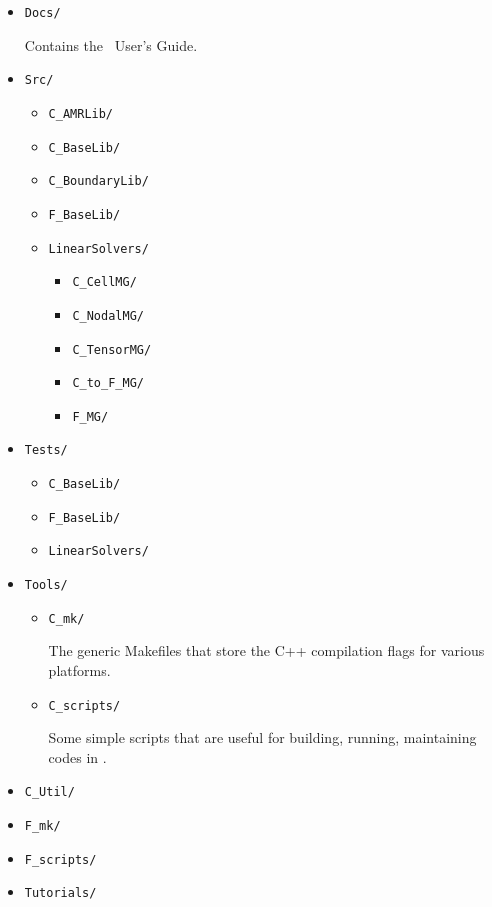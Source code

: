 \begin{itemize}

\item {\tt Docs/}

Contains the \BoxLib\ User's Guide.

\item {\tt Src/}

  \begin{itemize}

    \item {\tt C\_AMRLib/}
    \item {\tt C\_BaseLib/}
    \item {\tt C\_BoundaryLib/}
    \item {\tt F\_BaseLib/}
    \item {\tt LinearSolvers/}

    \begin{itemize}

      \item {\tt C\_CellMG/}
      \item {\tt C\_NodalMG/}
      \item {\tt C\_TensorMG/}
      \item {\tt C\_to\_F\_MG/}
      \item {\tt F\_MG/}

    \end{itemize}

  \end{itemize}

\item {\tt Tests/}

  \begin{itemize}

  \item {\tt C\_BaseLib/}
  \item {\tt F\_BaseLib/}
  \item {\tt LinearSolvers/}

  \end{itemize}

\item {\tt Tools/}

  \begin{itemize}

  \item {\tt C\_mk/}

  The generic Makefiles that store the C++ compilation flags for
  various platforms.

  \item {\tt C\_scripts/}

  Some simple scripts that are useful for building, running,
  maintaining codes in \BoxLib.

  \end{itemize}

  \item {\tt C\_Util/}
  \item {\tt F\_mk/}
  \item {\tt F\_scripts/}

\item {\tt Tutorials/}

\end{itemize}
